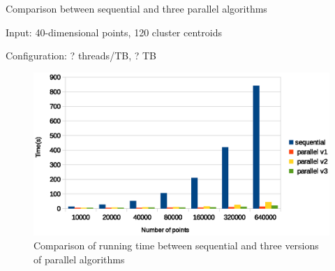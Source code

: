\documentclass[
nopagebreaks,
style=klope,
fleqn]{powerdot}
\begin{document}
\begin{slide}{Comparison between sequential and three parallel algorithms}

  \begin{compactitem}
  \item{Input: 40-dimensional points, 120 cluster centroids}
  \item{Configuration: ? threads/TB, ? TB}
  \end{compactitem}

  \begin{figure}[!h]
    \centering
    \includegraphics[width=0.7\linewidth]{fig/all_comparison}
    \caption{Comparison of running time between sequential and three versions of parallel algorithms}
    \label{fig:all}
  \end{figure}
\end{slide}
\end{document}

